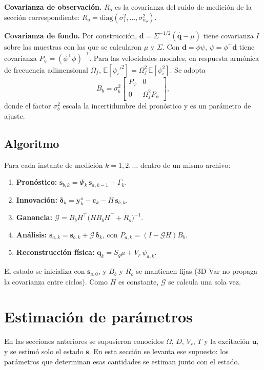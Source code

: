 \textbf{Covarianza de observación.} $R_o$ es la covarianza del ruido de medición de la sección correspondiente: 
$R_o=\mathrm{diag}(\sigma_1^2,\ldots,\sigma_{n_o}^2)$.

\textbf{Covarianza de fondo.} Por construcción, $\mathbf d=\Sigma^{-1/2}(\hat{\mathbf q}-\mu)$ tiene covarianza $I$ sobre
las muestras con las que se calcularon $\mu$ y $\Sigma$. Con $\mathbf d=\phi\psi$, $\psi=\phi^{+}\mathbf d$ tiene covarianza 
$P_\psi=(\phi^\top\phi)^{-1}$. Para las velocidades modales, en respuesta armónica de frecuencia adimensional $\Omega_f$, 
$\mathbb E[\psi_i'^2]=\Omega_f^2\,\mathbb E[\psi_i^2]$. Se adopta
\[
B_b=\sigma_b^2\begin{bmatrix}P_\psi&0\\0&\Omega_f^2P_\psi\end{bmatrix},
\]
donde el factor $\sigma_b^2$ escala la incertidumbre del pronóstico y es un parámetro de ajuste.

\subsection{Algoritmo}

Para cada instante de medición $k=1,2,\ldots$ dentro de un mismo archivo:
\begin{enumerate}
\item \textbf{Pronóstico:} $\mathbf s_{b,k}=\Phi_k\,\mathbf s_{a,k-1}+\Gamma_k$.
\item \textbf{Innovación:} $\boldsymbol\delta_k=\mathbf y^o_k-\mathbf c_k-H\,\mathbf s_{b,k}$.
\item \textbf{Ganancia:} $\mathcal G=B_bH^\top\big(HB_bH^\top+R_o\big)^{-1}$.
\item \textbf{Análisis:} $\mathbf s_{a,k}=\mathbf s_{b,k}+\mathcal G\,\boldsymbol\delta_k$, con $P_{a,k}=(I-\mathcal GH)B_b$.
\item \textbf{Reconstrucción física:} $\mathbf q_k=S_q\mu+V_r\,\psi_{a,k}$.
\end{enumerate}
El estado se inicializa con $\mathbf s_{a,0}$, y $B_b$ y $R_o$ se mantienen fijas 
(3D-Var no propaga la covarianza entre ciclos). Como $H$ es constante, $\mathcal G$ se calcula una sola vez.

\section{Estimación de parámetros}

En las secciones anteriores se supusieron conocidos $\Omega$, $D$, $V_r$, $T$ y la excitación $\mathbf u$, y se estimó solo el estado $\mathbf s$. En esta sección se levanta ese supuesto: los parámetros que determinan esas cantidades se estiman junto con el estado.

